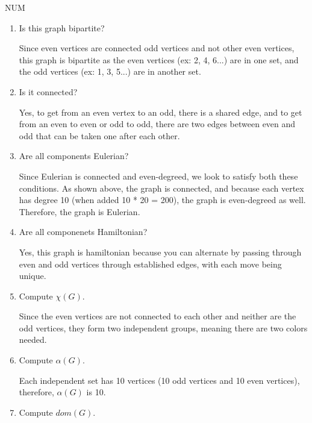 \documentclass[11pt]{article}
\begin{document}
\begin{enumerate}[leftmargin=*]
\begin{graphfig}{NUM}
    \end{graphfig}
    \begin{enumerate}
        \item Is this graph bipartite?
        \begin{solution}
            Since even vertices are connected odd vertices and not other even vertices, this graph is bipartite as the even vertices (ex: 2, 4, 6...) are in one set, and the odd vertices (ex: 1, 3, 5...) are in another set. 
        \end{solution}
        \item Is it connected?
        \begin{solution}
            Yes, to get from an even vertex to an odd, there is a shared edge, and to get from an even to even or odd to odd, there are two edges between even and odd that can be taken one after each other. 
        \end{solution}
        \item Are all components Eulerian?
        \begin{solution}
            Since Eulerian is connected and even-degreed, we look to satisfy both these conditions. As shown above, the graph is connected, and because each vertex has degree 10 (when added 10 * 20 = 200), the graph is even-degreed as well. Therefore, the graph is Eulerian.  
        \end{solution}
        \item Are all componenets Hamiltonian?
        \begin{solution}
            Yes, this graph is hamiltonian because you can alternate by passing through even and odd vertices through established edges, with each move being unique.   
        \end{solution}
        \item Compute $\chi(G)$.
        \begin{solution}
            Since the even vertices are not connected to each other and neither are the odd vertices, they form two independent groups, meaning there are two colors needed.  
        \end{solution}
        \item Compute $\alpha(G)$.
        \begin{solution}
            Each independent set has 10 vertices (10 odd vertices and 10 even vertices), therefore, $\alpha(G)$ is 10. 
        \end{solution}
        \item Compute $dom(G)$.

\end{enumerate}
\end{enumerate}
\end{document}
